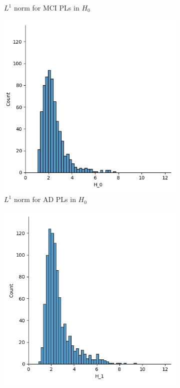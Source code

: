 \documentclass{article}
\begin{document}
\begin{figure}
\begin{subfigure}{0.32\textwidth}
    \caption{$L^1$ norm for MCI PLs in $H_0$}
  \end{subfigure}
  \begin{subfigure}{0.32\textwidth}
    \includegraphics[width=\textwidth]{figures/median_pls/median_pl_AD_H_0.png}
    \caption{$L^1$ norm for AD PLs in $H_0$}
  \end{subfigure}
  \begin{subfigure}{0.32\textwidth}
    \includegraphics[width=\textwidth]{figures/median_pls/median_pl_CN_H_1.png}

\end{subfigure}
\end{figure}
\end{document}
